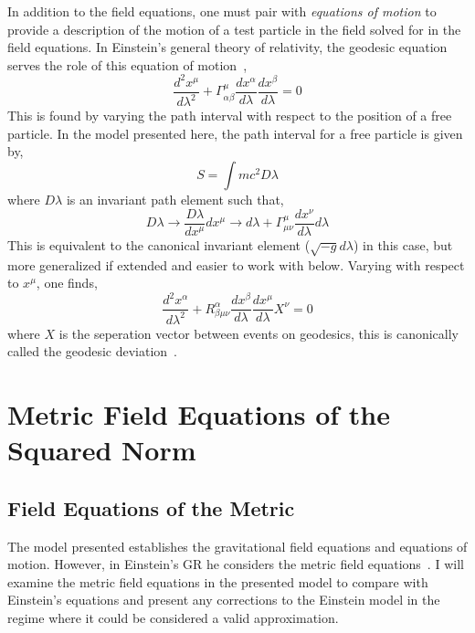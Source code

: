 \documentclass[aps,prd,preprint]{revtex4-1}
\begin{document}
In addition to the field equations, one must pair with {\it equations of motion\/} to provide a description of the motion of a test particle in the field solved for in the field equations. In Einstein's general theory of relativity, the geodesic equation serves the role of this equation of motion~\cite{hauser_2019_1,hauser_2019_2,hauser_2019_3},
\begin{equation}\label{geodesic_equation}
    \frac{d^2x^\mu}{d\lambda^2} + \Gamma^{\mu}_{\alpha\beta}\frac{dx^\alpha}{d\lambda}\frac{dx^\beta}{d\lambda} = 0
\end{equation}
This is found by varying the path interval with respect to the position of a free particle. In the model presented here, the path interval for a free particle is given by,
\begin{equation}\label{free_particle_action}
    S = \int mc^2 D\lambda
\end{equation}
where $D\lambda$ is an invariant path element such that,
\begin{equation}
    D\lambda \rightarrow \frac{D\lambda}{dx^\mu}dx^{\mu} \rightarrow d\lambda + \Gamma^{\mu}_{\mu\nu}\frac{dx^{\nu}}{d\lambda}d\lambda
\end{equation}
This is equivalent to the canonical invariant element ($\sqrt{-g}d\lambda$) in this case, but more generalized if extended and easier to work with below. Varying with respect to $x^{\mu}$, one finds,
\begin{equation}\label{geodesic_deviation}
    \frac{d^2 x^\alpha}{d\lambda^2} + R^{\alpha}_{\beta\mu\nu}\frac{dx^\beta}{d\lambda}\frac{dx^\mu}{d\lambda}X^{\nu} = 0
\end{equation}
where $X$ is the seperation vector between events on geodesics, this is canonically called the geodesic deviation~\cite{philipp_2015,ganiou_2016}.

\section{Metric Field Equations of the Squared Norm}
\subsection*{Field Equations of the Metric}
The model presented establishes the gravitational field equations and equations of motion. However, in Einstein's GR he considers the metric field equations~\cite{Einstein_1915,Einstein_1916}. I will examine the metric field equations in the presented model to compare with Einstein's equations and present any corrections to the Einstein model in the regime where it could be considered a valid approximation.
\end{document}
